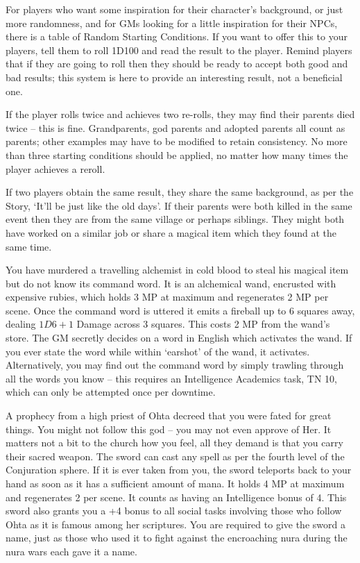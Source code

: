 \begin{multicols}{2}

For players who want some inspiration for their character's background, or just more randomness, and for GMs looking for a little inspiration for their NPCs, there is a table of Random Starting Conditions.  If you want to offer this to your players, tell them to roll 1D100 and read the result to the player.  Remind players that if they are going to roll then they should be ready to accept both good and bad results; this system is here to provide an interesting result, not a beneficial one.

If the player rolls twice and achieves two re-rolls, they may find their parents died twice -- this is fine.
Grandparents, god parents and adopted parents all count as parents; other examples may have to be modified to retain consistency.
No more than three starting conditions should be applied, no matter how many times the player achieves a reroll.

	If two players obtain the same result, they share the same background, as per the Story, `It'll be just like the old days'.  If their parents were both killed in the same event then they are from the same village or perhaps siblings.  They might both have worked on a similar job or share a magical item which they found at the same time.

\setcounter{list}{0}
\begin{list}{\addtocounter{list}{1}\textbf{:}}{\raggedleft}

	\item{ You have murdered a travelling alchemist in cold blood to steal his magical item but do not know its command word.  It is an alchemical wand, encrusted with expensive rubies, which holds 3 MP at maximum and regenerates 2 MP per scene.  Once the command word is uttered it emits a fireball up to 6 squares away, dealing $1D6+1$ Damage across 3 squares.   This costs 2 MP from the wand's store.  The GM secretly decides on a word in English which activates the wand.  If you ever state the word while within `earshot' of the wand, it activates.  Alternatively, you may find out the command word by simply trawling through all the words you know -- this requires an Intelligence  Academics task, TN 10, which can only be attempted once per downtime. }

	\item{ A prophecy from a high priest of Ohta decreed that you were fated for great things.  You might not follow this god -- you may not even approve of Her.  It matters not a bit to the church how you feel, all they demand is that you carry their sacred weapon.  The sword can cast any spell as per the fourth level of the Conjuration sphere.  If it is ever taken from you, the sword teleports back to your hand as soon as it has a sufficient amount of mana.  It holds 4 MP at maximum and regenerates 2 per scene.  It counts as having an Intelligence bonus of 4.  This sword also grants you a +4 bonus to all social tasks involving those who follow Ohta as it is famous among her scriptures.  You are required to give the sword a name, just as those who used it to fight against the encroaching nura during the nura wars each gave it a name.}


\end{list}
\end{multicols}
